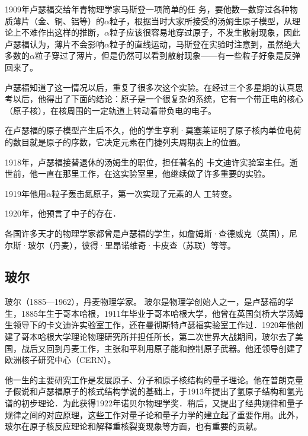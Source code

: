 1909年卢瑟福交给年青物理学家马斯登一项简单的任
务，要他数一数穿过各种物质薄片（金、铜、铝等）的$\alpha$粒子，根据当时大家所接受的汤姆生原子模型，从理论上不难作出这样的推断，$\alpha$粒子应该很容易地穿过原子，不发生散射现象，因此卢瑟福认为，薄片不会影响$\alpha$粒子的直线运动，马斯登在实验时注意到，虽然绝大多数的$\alpha$粒子穿过了薄片，但是仍然可以看到散射现象——有一些粒子好象是反弹回来了。

卢瑟福知道了这一情况以后，重复了很多次这个实验。在经过三个多星期的认真思考以后，他得出了下面的结论：原子是一个很复杂的系统，它有一个带正电的核心（原子核），在核周围的一定轨道上转动着带负电的电子。

在卢瑟福的原子模型产生后不久，他的学生亨利·莫塞莱证明了原子核内单位电荷的数目就是原子的序数，它决定元素在门捷列夫周期表上的位置。

1918年，卢瑟福接替退休的汤姆生的职位，担任著名的
卡文迪许实验室主任。逝世前，他一直在那里工作，在这实验室里，他继续做了许多重要的实验。

1919年他用$\alpha$粒子轰击氮原子，第一次实现了元素的人
工转变。

1920年，他预言了中子的存在．

各国许多天才的物理学家都曾是卢瑟福的学生，如詹姆斯·查德威克（英国），尼尔斯·玻尔（丹麦），彼得·里昂诺维奇·卡皮查（苏联）等等。

\subsection{玻尔}
玻尔（1885—1962），丹麦物理学家。
玻尔是物理学创始人之一，是卢瑟福的学生，1885年生于哥本哈根，1911年毕业于哥本哈根大学，他曾在英国剑桥大学汤姆生领导下的卡文迪许实验室工作，还在曼彻斯特卢瑟福实验室工作过．1920年他创建了哥本哈根大学理论物理研究所并担任所长，第二次世界大战期间，玻尔去了美国，战后又回到丹麦工作，主张和平利用原子能和控制原子武器。他还领导创建了欧洲核子研究中心（CERN）。

他一生的主要研究工作是发展原子、分子和原子核结构的量子理论。他在普朗克量子假说和卢瑟福原子的核式结构学说的基础上，于1913年提出了氢原子结构和氢光谱的初步理论．为此获得1922年诺贝尔物理学奖．稍后，又提出了经典规律和量子规律之间的对应原理，这些工作对量子论和量子力学的建立起了重要作用。此外，玻尔在原子核反应理论和解释重核裂变现象等方面，也有重要的贡献。





